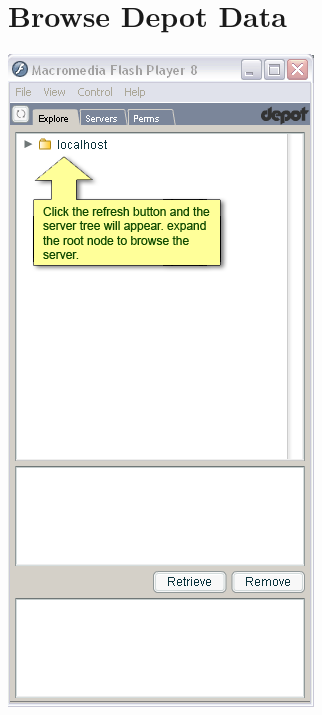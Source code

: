 \documentclass{report}
\begin{document}
\section{Browse Depot Data}
\begin{center}
\includegraphics[scale=0.5]{users-images/Step5-annotated.png}

\end{center}
\end{document}
